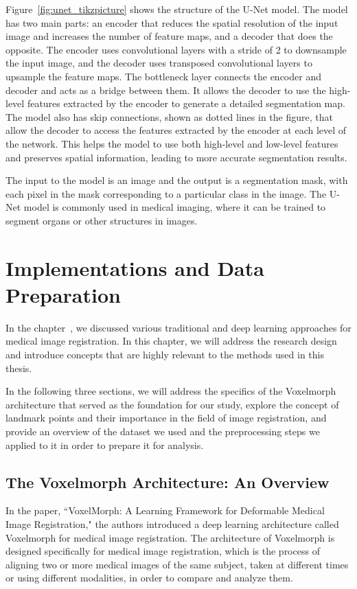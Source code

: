 \documentclass{book}
\begin{document}
	Figure~\ref{fig:unet_tikzpicture} shows the structure of the U-Net model. The model has two main parts: an encoder that reduces the spatial resolution of the input image and increases the number of feature maps, and a decoder that does the opposite. The encoder uses convolutional layers with a stride of 2 to downsample the input image, and the decoder uses transposed convolutional layers to upsample the feature maps. The bottleneck layer connects the encoder and decoder and acts as a bridge between them. It allows the decoder to use the high-level features extracted by the encoder to generate a detailed segmentation map. The model also has skip connections, shown as dotted lines in the figure, that allow the decoder to access the features extracted by the encoder at each level of the network. This helps the model to use both high-level and low-level features and preserves spatial information, leading to more accurate segmentation results.
	
	The input to the model is an image and the output is a segmentation mask, with each pixel in the mask corresponding to a particular class in the image. The U-Net model is commonly used in medical imaging, where it can be trained to segment organs or other structures in images.
	
	\chapter{Implementations and Data Preparation}\label{chap:imp_and_data}
	In the chapter~, we discussed various traditional and deep learning approaches for medical image registration. In this chapter, we will address the research design and introduce concepts that are highly relevant to the methods used in this thesis.
	
	In the following three sections, we will address the specifics of the Voxelmorph architecture \cite{Balakrishnan_2019} that served as the foundation for our study, explore the concept of landmark points and their importance in the field of image registration, and provide an overview of the dataset we used and the preprocessing steps we applied to it in order to prepare it for analysis.
	
	\section{The Voxelmorph Architecture: An Overview}
	\label{sec:vxm_architecture}
	
	In the paper, ``VoxelMorph: A Learning Framework for Deformable Medical Image Registration," \cite{Balakrishnan_2019} the authors introduced a deep learning architecture called Voxelmorph for medical image registration. The architecture of Voxelmorph is designed specifically for medical image registration, which is the process of aligning two or more medical images of the same subject, taken at different times or using different modalities, in order to compare and analyze them.
	
\end{document}
